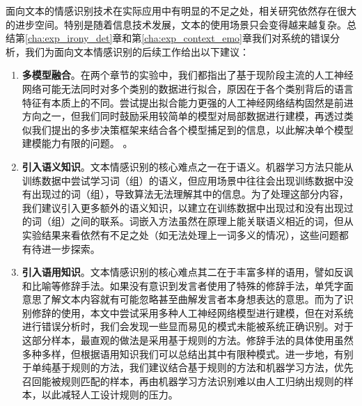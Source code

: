 面向文本的情感识别技术在实际应用中有明显的不足之处，相关研究依然存在很大的进步空间。特别是随着信息技术发展，文本的使用场景只会变得越来越复杂。总结第\ref{cha:exp_irony_det}章和第\ref{cha:exp_context_emo}章我们对系统的错误分析，我们为面向文本情感识别的后续工作给出以下建议：

\begin{enumerate}

\item {\bf 多模型融合}。在两个章节的实验中，我们都指出了基于现阶段主流的人工神经网络可能无法同时对多个类别的数据进行拟合，原因在于各个类别背后的语言特征有本质上的不同。尝试提出拟合能力更强的人工神经网络结构固然是前进方向之一，但我们同时鼓励采用较简单的模型对局部数据进行建模，再透过类似我们提出的多步决策框架来结合各个模型捕足到的信息，以此解决单个模型建模能力有限的问题。
。

\item {\bf 引入语义知识}。文本情感识别的核心难点之一在于语义。机器学习方法只能从训练数据中尝试学习词（组）的语义，但应用场景中往往会出现训练数据中没有出现过的词（组），导致算法无法理解其中的信息。为了处理这部分内容，我们建议引入更多额外的语义知识，以建立在训练数据中出现过和没有出现过的词（组）之间的联系。词嵌入方法虽然在原理上能关联语义相近的词，但从实验结果来看依然有不足之处（如无法处理上一词多义的情况），这些问题都有待进一步探索。

\item {\bf 引入语用知识}。文本情感识别的核心难点其二在于丰富多样的语用，譬如反讽和比喻等修辞手法。如果没有意识到发言者使用了特殊的修辞手法，单凭字面意思了解文本内容就有可能忽略甚至曲解发言者本身想表达的意思。而为了识别修辞的使用，本文中尝试采用多种人工神经网络模型进行建模，但在对系统进行错误分析时，我们会发现一些显而易见的模式未能被系统正确识别。对于这部分样本，最直观的做法是采用基于规则的方法。修辞手法的具体使用虽然多种多样，但根据语用知识我们可以总结出其中有限种模式。进一步地，有别于单纯基于规则的方法，我们建议结合基于规则的方法和机器学习方法，优先召回能被规则匹配的样本，再由机器学习方法识别难以由人工归纳出规则的样本，以此减轻人工设计规则的压力。

\end{enumerate}







